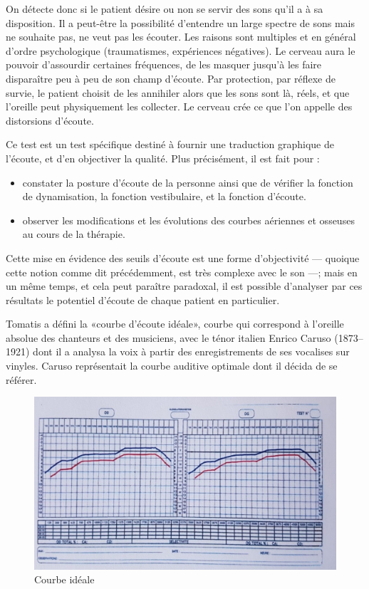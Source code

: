   On détecte donc si le patient désire ou non se servir des sons
  qu'il a à sa disposition. Il a peut-être la possibilité d'entendre un large spectre de
  sons mais ne souhaite pas, ne veut pas les écouter. Les raisons sont multiples et en général d'ordre psychologique (traumatismes,
  expériences négatives). Le cerveau aura le
  pouvoir d'assourdir certaines fréquences, de les masquer jusqu'à les faire disparaître peu à peu de
  son champ d'écoute. Par protection, par réflexe de survie, le
  patient choisit de les
  annihiler alors que les sons sont là, réels, et que  l'oreille peut physiquement les collecter. Le cerveau crée ce
  que l'on appelle des distorsions
  d'écoute\autocite{tomatis:education}.

  
  Ce test est un test spécifique destiné à fournir une traduction
graphique de l'écoute, et d'en objectiver la qualité. Plus précisément,
il  est fait pour :
\begin{itemize}
\item constater la posture d'écoute de la personne ainsi que de vérifier
la fonction de dynamisation, la fonction vestibulaire,
et la fonction d'écoute.
\item observer les modifications et les évolutions des courbes
  aériennes et osseuses au cours
de la thérapie.
\end{itemize}

Cette mise en évidence des seuils d'écoute est une forme d'objectivité
--- quoique cette notion comme dit précédemment, est très complexe
avec le son ---; mais en un même temps, et cela peut paraître paradoxal, il
est possible d'analyser par ces résultats le potentiel d'écoute de
chaque patient en particulier.




Tomatis a défini la «courbe d'écoute idéale», courbe qui correspond à l'oreille absolue
des chanteurs et des musiciens,  avec  le ténor italien Enrico
Caruso (1873--1921) dont il a analysa la voix à partir des enregistrements
de ses vocalises sur vinyles. Caruso représentait la courbe auditive
optimale dont il décida de se référer.

\begin{figure}
	\centering
	\includegraphics[width=0.7\linewidth]{images/courbeideale.jpg}
	\caption{Courbe idéale}
	\label{fig:courbeideale}
      \end{figure}

